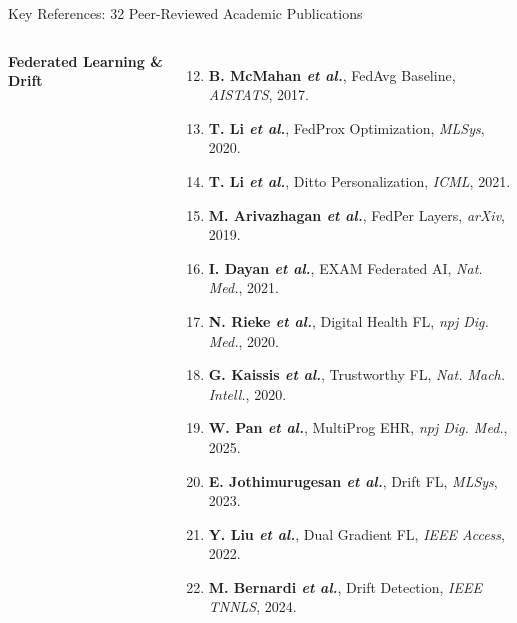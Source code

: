 \documentclass[aspectratio=169, 10pt]{beamer}
\begin{document}
\begin{frame}{Key References: 32 Peer-Reviewed Academic Publications}
\begin{columns}[T]
        {\fontsize{4.8pt}{5.8pt}\selectfont
        \textbf{\textcolor{amritaMaroon}{Federated Learning \& Drift}}
        \begin{enumerate}
            \setcounter{enumi}{11}
            \setlength\itemsep{0.14em}
            \item \textbf{B. McMahan \textit{et al.}}, FedAvg Baseline, \textit{AISTATS}, 2017.
            \item \textbf{T. Li \textit{et al.}}, FedProx Optimization, \textit{MLSys}, 2020.
            \item \textbf{T. Li \textit{et al.}}, Ditto Personalization, \textit{ICML}, 2021.
            \item \textbf{M. Arivazhagan \textit{et al.}}, FedPer Layers, \textit{arXiv}, 2019.
            \item \textbf{I. Dayan \textit{et al.}}, EXAM Federated AI, \textit{Nat. Med.}, 2021.
            \item \textbf{N. Rieke \textit{et al.}}, Digital Health FL, \textit{npj Dig. Med.}, 2020.
            \item \textbf{G. Kaissis \textit{et al.}}, Trustworthy FL, \textit{Nat. Mach. Intell.}, 2020.
            \item \textbf{W. Pan \textit{et al.}}, MultiProg EHR, \textit{npj Dig. Med.}, 2025.
            \item \textbf{E. Jothimurugesan \textit{et al.}}, Drift FL, \textit{MLSys}, 2023.
            \item \textbf{Y. Liu \textit{et al.}}, Dual Gradient FL, \textit{IEEE Access}, 2022.
            \item \textbf{M. Bernardi \textit{et al.}}, Drift Detection, \textit{IEEE TNNLS}, 2024.
        \end{enumerate}
        }


\end{columns}
\end{frame}
\end{document}
